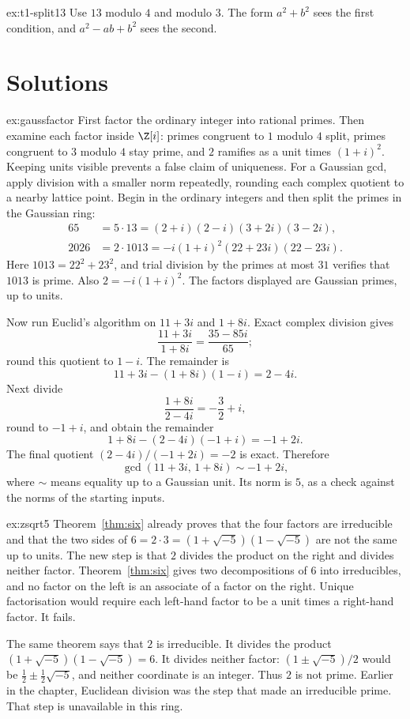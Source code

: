 \begin{hint}{ex:t1-split13}
Use $13$ modulo $4$ and modulo $3$. The form $a^2+b^2$ sees the first condition, and $a^2-ab+b^2$ sees the second.
\end{hint}

\section{Solutions}

\begin{solution}{ex:gaussfactor}
\idea First factor the ordinary integer into rational primes. Then examine each factor inside $\Z[i]$: primes congruent to $1$ modulo $4$ split, primes congruent to $3$ modulo $4$ stay prime, and $2$ ramifies as a unit times $(1+i)^2$. Keeping units visible prevents a false claim of uniqueness. For a Gaussian gcd, apply division with a smaller norm repeatedly, rounding each complex quotient to a nearby lattice point.
\writeup Begin in the ordinary integers and then split the primes in the Gaussian ring:
\[
\begin{aligned}
65&=5\cdot13=(2+i)(2-i)(3+2i)(3-2i),\\
2026&=2\cdot1013=-i(1+i)^2(22+23i)(22-23i).
\end{aligned}
\]
Here $1013=22^2+23^2$, and trial division by the primes at most $31$ verifies that $1013$ is prime. Also $2=-i(1+i)^2$. The factors displayed are Gaussian primes, up to units.

Now run Euclid's algorithm on $11+3i$ and $1+8i$. Exact complex division gives
\[
\frac{11+3i}{1+8i}=\frac{35-85i}{65};
\]
round this quotient to $1-i$. The remainder is
\[
11+3i-(1+8i)(1-i)=2-4i.
\]
Next divide
\[
\frac{1+8i}{2-4i}=-\frac32+i,
\]
round to $-1+i$, and obtain the remainder
\[
1+8i-(2-4i)(-1+i)=-1+2i.
\]
The final quotient $(2-4i)/(-1+2i)=-2$ is exact. Therefore
\[
\gcd(11+3i,\,1+8i)\sim-1+2i,
\]
where $\sim$ means equality up to a Gaussian unit. Its norm is $5$, as a check against the norms of the starting inputs.
\end{solution}

\begin{solution}{ex:zsqrt5}
\idea Theorem~\ref{thm:six} already proves that the four factors are irreducible and that the two sides of $6=2\cdot3=(1+\sqrt{-5})(1-\sqrt{-5})$ are not the same up to units. The new step is that $2$ divides the product on the right and divides neither factor.
\writeup Theorem~\ref{thm:six} gives two decompositions of $6$ into irreducibles, and no factor on the left is an associate of a factor on the right. Unique factorisation would require each left-hand factor to be a unit times a right-hand factor. It fails.

The same theorem says that $2$ is irreducible. It divides the product $(1+\sqrt{-5})(1-\sqrt{-5})=6$. It divides neither factor: $(1\pm\sqrt{-5})/2$ would be $\frac12\pm\frac12\sqrt{-5}$, and neither coordinate is an integer. Thus $2$ is not prime. Earlier in the chapter, Euclidean division was the step that made an irreducible prime. That step is unavailable in this ring.
\end{solution}


